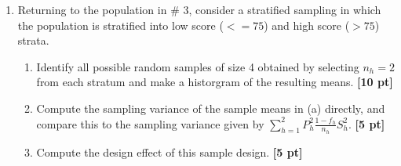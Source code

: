 \documentclass[12pt]{article}
\begin{document}
\begin{enumerate}
\item Returning to the population in \# 3, consider a stratified sampling in which the population is stratified into low score ($<= 75$) and high score ($> 75$) strata.
	\begin{enumerate}
		\item Identify all possible random samples of size 4 obtained by selecting $n_h = 2$ from each stratum and make a historgram of the resulting means. {\bf [10 pt] }
		\item Compute the sampling variance of the sample means in (a) directly, and compare this to the sampling variance given by $\sum_{h=1}^2 P_h^2 \frac{1-f_h}{n_h} S_h^2$. {\bf [5 pt] }
		\item Compute the design effect of this sample design. {\bf [5 pt]}
	\end{enumerate}

\end{enumerate}
\end{document}
